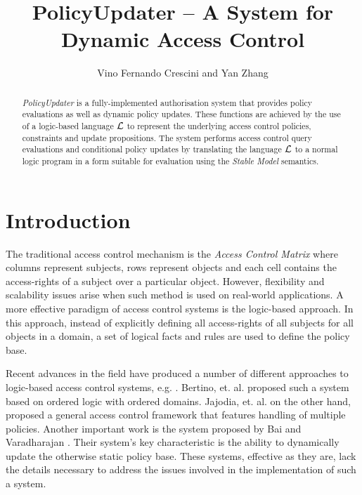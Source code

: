 \documentclass[global,twocolumn,final]{svjour}
\begin{document}
  \title{PolicyUpdater -- A System for Dynamic Access Control}
  \author{Vino Fernando Crescini and Yan Zhang}

  \maketitle

  \begin{abstract}
    {\em PolicyUpdater} is a fully-implemented authorisation system that
    provides policy evaluations as well as dynamic policy updates. These
    functions are achieved by the use of a logic-based language ${\cal L}$ to
    represent the underlying access control policies, constraints and update
    propositions. The system performs access control query evaluations and
    conditional policy updates by translating the language $\cal{L}$ to a
    normal logic program in a form suitable for evaluation using the
    {\em Stable Model} semantics.
  \end{abstract}


  \section{Introduction}

    The traditional access control mechanism is the {\em Access Control Matrix}
    where columns represent subjects, rows represent objects and each cell
    contains the access-rights of a subject over a particular object. However,
    flexibility and scalability issues arise when such method is used on
    real-world applications. A more effective paradigm of access control
    systems is the logic-based approach. In this approach, instead of
    explicitly defining all access-rights of all subjects for all objects
    in a domain, a set of logical facts and rules are used to define the
    policy base.

    Recent advances in the field have produced a number of different approaches
    to logic-based access control systems, e.g. \cite{HAL,LI}. Bertino, et. al.
    \cite{BE1} proposed such a system based on ordered logic with ordered
    domains. Jajodia, et. al. \cite{JAJ} on the other hand, proposed a general
    access control framework that features handling of multiple policies.
    Another important work is the system proposed by Bai and Varadharajan
    \cite{BA1,BA2}. Their system's key characteristic is the ability to
    dynamically update the otherwise static policy base. These systems,
    effective as they are, lack the details necessary to address the issues
    involved in the implementation of such a system.
\end{document}
